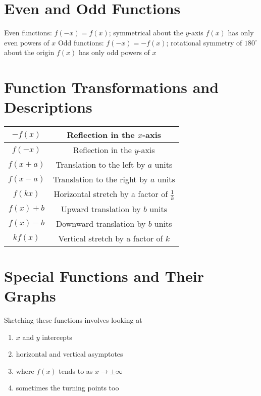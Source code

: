 \documentclass[11pt]{article}
\newcommand{\degsym}{^{\circ}}
\begin{document}
\pagebreak

\section{Even and Odd Functions}

\begin{outline}[enumerate]
  \1 Even functions: $f(-x) = f(x)$; symmetrical about the $y$-axis
  \2 $f(x)$ has only even powers of $x$
  \1 Odd functions: $f(-x) = -f(x)$; rotational symmetry of $180\degsym$ about the origin
  \2 $f(x)$ has only odd powers of $x$
\end{outline}

\section{Function Transformations and Descriptions}

\begin{center}
  \bgroup
  \def\arraystretch{1.5}
  \begin{tabular}{|c|c|}
    \hline
    $-f(x)$    & Reflection in the $x$-axis                      \\ \hline
    $f(-x)$    & Reflection in the $y$-axis                      \\ \hline
    $f(x + a)$ & Translation to the left by $a$ units            \\ \hline
    $f(x - a)$ & Translation to the right by $a$ units           \\ \hline
    $f(kx)$    & Horizontal stretch by a factor of $\frac{1}{k}$ \\ \hline
    $f(x) + b$ & Upward translation by $b$ units                 \\ \hline
    $f(x) - b$ & Downward translation by $b$ units               \\ \hline
    $kf(x)$    & Vertical stretch by a factor of $k$             \\ \hline
  \end{tabular}
  \egroup
\end{center}

\pagebreak

\section{Special Functions and Their Graphs}
Sketching these functions involves looking at
\begin{enumerate}
  \item $x$ and $y$ intercepts
  \item horizontal and vertical asymptotes
  \item where $f(x)$ tends to as $x\to\pm\infty$
  \item sometimes the turning points too
\end{enumerate}
\end{document}
